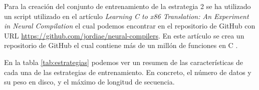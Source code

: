 Para la creación del conjunto de entrenamiento de la estrategia 2 se ha utilizado un script
utilizado en el artículo \textit{Learning C to x86 Translation: An Experiment in Neural Compilation}
el cual podemos encontrar en el repositorio de GitHub con URL \url{https://github.com/jordiae/neural-compilers}.
En este artículo se crea un repositorio de GitHub el cual contiene más de un millón de funciones en C
\cite{Armengol-EstapéJordi2021LCtx}.

En la tabla \ref{tab:estrategias} podemos ver un resumen de las características de cada una de las estrategias
de entrenamiento. En concreto, el número de datos y su peso en disco, y el máximo de longitud
de secuencia.










